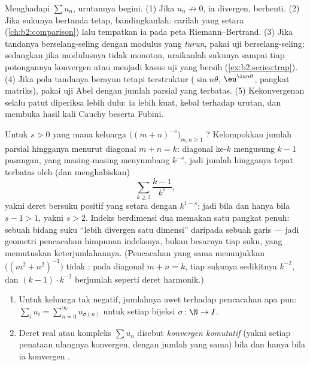 \begin{method}\label{met:b2:series:choosing}
Menghadapi $\sum u_n$, urutannya begini. (1) Jika $u_n \not\to 0$, ia
divergen, berhenti. (2) Jika sukunya bertanda tetap, bandingkanlah:
carilah yang setara (\cref{ch:b2:comparison}) lalu tempatkan ia pada
peta Riemann--Bertrand. (3) Jika tandanya berselang-seling dengan
modulus yang \emph{turun}, pakai uji berselang-seling; sedangkan jika
modulusnya tidak monoton, uraikanlah sukunya sampai tiap potongannya
konvergen  atau menjadi kasus uji yang bersih
(\cref{ex:b2:series:trap}). (4) Jika pola tandanya berayun tetapi
terstruktur ($\sin n\theta$, $\eu^{\iu n\theta}$, pangkat matriks),
pakai uji Abel dengan jumlah parsial yang terbatas. (5) Kekonvergenan
 selalu patut diperiksa lebih dulu: ia lebih kuat, kebal terhadap
urutan, dan membuka hasil kali Cauchy beserta Fubini.
\end{method}

\begin{example}\label{ex:b2:series:diagonalcount}
Untuk $s > 0$ yang mana keluarga
$\bigl((m + n)^{-s}\bigr)_{m, n \geq 1}$ ? Kelompokkan
jumlah parsial hingganya menurut diagonal $m + n = k$: diagonal ke-$k$
mengusung $k - 1$ pasangan, yang masing-masing menyumbang $k^{-s}$, jadi
jumlah hingganya tepat terbatas oleh (dan menghabiskan)
\[
\sum_{k \geq 2} \frac{k - 1}{k^{s}} ,
\]
yakni deret bersuku positif yang setara dengan $k^{1-s}$: jadi
 bila dan hanya bila $s - 1 > 1$, yakni $s > 2$. Indeks
berdimensi dua memakan satu pangkat penuh: sebuah bidang suku ``lebih
divergen satu dimensi'' daripada sebuah garis --- jadi geometri
pencacahan himpunan indeksnya, bukan besarnya tiap suku, yang
memutuskan keterjumlahannya.
(Pencacahan yang sama menunjukkan $\bigl((m^2 + n^2)^{-1}\bigr)$ tidak
: pada diagonal $m + n = k$, tiap sukunya sedikitnya
$k^{-2}$, dan $(k-1)\cdot k^{-2}$ berjumlah seperti deret
harmonik.)
\end{example}

\begin{theorem}\label{thm:b2:series:rearrangement}
\begin{enumerate}
  \item Untuk keluarga tak negatif, jumlahnya awet terhadap
        pencacahan apa pun: $\sum_{i} u_i = \sum_{n=0}^{\infty}
        u_{\sigma(n)}$ untuk setiap bijeksi $\sigma \colon \N \to I$.
  \item Deret real atau kompleks $\sum u_n$ disebut \emph{konvergen
        komutatif} (yakni setiap penataan ulangnya konvergen, dengan
        jumlah yang sama) bila dan hanya bila ia konvergen .
\end{enumerate}
\end{theorem}

